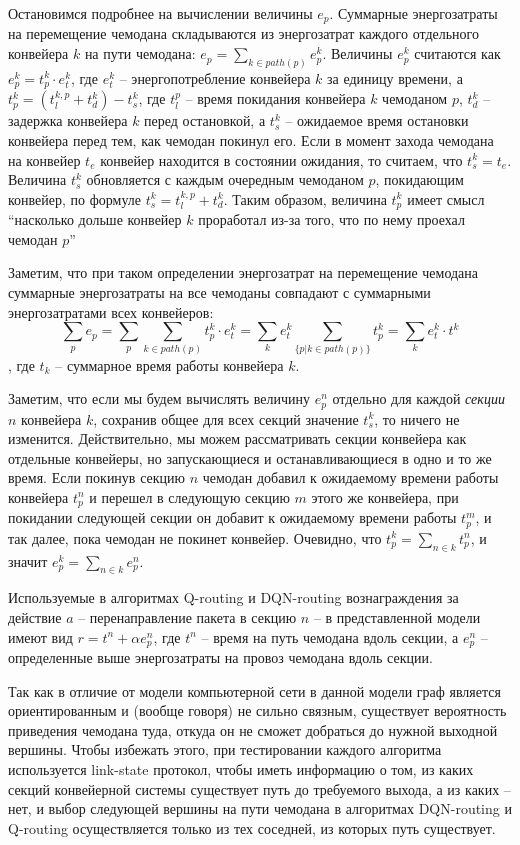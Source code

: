 \documentclass[specification, annotation]{itmo-student-thesis}
\begin{document}
Остановимся подробнее на вычислении величины $e_p$. Суммарные энергозатраты на
перемещение чемодана складываются из энергозатрат каждого отдельного конвейера
$k$ на пути чемодана: $e_p = \sum\limits_{k \in path(p)} {e_p^k}$.
Величины $e_p^k$ считаются как $e_p^k = t_p^k \cdot e_t^k$, где $e_t^k$ --
энергопотребление конвейера $k$ за единицу времени, а
$t_p^k = (t_l^{k,p} + t_d^k) - t_s^k$, где $t_l^p$ -- время покидания конвейера $k$
чемоданом $p$, $t_d^k$ -- задержка конвейера $k$ перед остановкой, а $t_s^k$ --
ожидаемое время остановки конвейера перед тем, как чемодан покинул его. Если в
момент захода чемодана на конвейер $t_e$ конвейер находится в состоянии
ожидания, то считаем, что $t_s^k = t_e$. Величина $t_s^k$ обновляется с каждым
очередным чемоданом $p$, покидающим конвейер, по формуле
$t_s^k = t_l^{k,p} + t_d^k$. Таким образом, величина $t_p^k$ имеет смысл
``насколько дольше конвейер $k$ проработал из-за того, что по нему проехал
чемодан $p$''

Заметим, что при таком определении энергозатрат на перемещение чемодана
суммарные энергозатраты на все чемоданы совпадают с суммарными энергозатратами
всех конвейеров:
\[
\sum\limits_p {e_p} = \sum\limits_p {\sum\limits_{k \in path(p)} {t_p^k \cdot
    e_t^k}} = \sum\limits_k {e_t^k \sum\limits_{\{p | k \in path(p)\}} {t_p^k}}
= \sum\limits_k {e_t^k \cdot t^k} 
\],
где $t_k$ -- суммарное время работы конвейера $k$.

Заметим, что если мы будем вычислять величину $e_p^n$ отдельно для каждой
\textit{секции} $n$ конвейера $k$, сохранив общее для всех секций значение
$t_s^k$, то ничего не изменится. Действительно, мы можем рассматривать секции
конвейера как отдельные конвейеры, но запускающиеся и останавливающиеся в одно и
то же время. Если покинув секцию $n$ чемодан добавил к ожидаемому времени работы
конвейера $t_p^n$ и перешел в следующую секцию $m$ этого же конвейера, при покидании
следующей секции он добавит к ожидаемому времени работы $t_p^m$, и так далее,
пока чемодан не покинет конвейер. Очевидно, что $t_p^k = \sum_{n \in k} t_p^n$,
и значит $e_p^k = \sum_{n \in k} e_p^n$. 

Используемые в алгоритмах Q-routing и DQN-routing вознаграждения за действие $a$
-- перенаправление пакета в секцию $n$ -- в представленной модели имеют вид
$r =t^n + \alpha e_p^n$, где $t^n$ -- время на путь чемодана вдоль секции, а $e_p^n$
-- определенные выше энергозатраты на провоз чемодана вдоль секции.

Так как в отличие от модели компьютерной сети в данной модели граф является
ориентированным и (вообще говоря) не сильно связным, существует вероятность
приведения чемодана туда, откуда он не сможет добраться до нужной выходной
вершины. Чтобы избежать этого, при тестировании каждого алгоритма
используется link-state протокол, чтобы иметь информацию о том, из каких секций
конвейерной системы существует путь до требуемого выхода, а из каких -- нет, и
выбор следующей вершины на пути чемодана в алгоритмах DQN-routing и Q-routing
осуществляется только из тех соседней, из которых путь существует.
\end{document}
